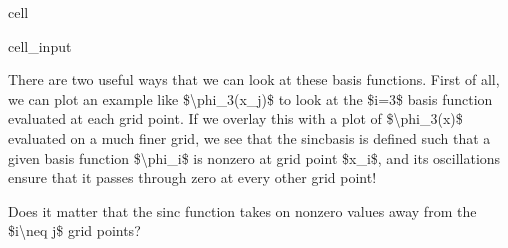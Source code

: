 \documentclass[letterpaper,10pt,english]{jupyterBook}
\begin{document}
\begin{sphinxuseclass}{cell}\begin{sphinxVerbatimInput}

\begin{sphinxuseclass}{cell_input}
\begin{sphinxVerbatim}[commandchars=\\\{\}]
  
  
  

  
  
  

 
       
\end{sphinxVerbatim}

\end{sphinxuseclass}\end{sphinxVerbatimInput}

\end{sphinxuseclass}
\sphinxAtStartPar
There are two useful ways that we can look at these basis functions. First of all, we can plot an example like \$\textbackslash{}phi\_3(x\_j)\$ to look at the \$i=3\$ basis function evaluated at each grid point. If we overlay this with a plot of \$\textbackslash{}phi\_3(x)\$ evaluated on a much finer grid, we see that the sinc\sphinxhyphen{}basis is defined such that a given basis function \$\textbackslash{}phi\_i\$ is nonzero at grid point \$x\_i\$, and its oscillations ensure that it passes through zero at every other grid point!

\sphinxAtStartPar
{} Does it matter that the sinc function takes on nonzero values away from the \$i\textbackslash{}neq j\$ grid points?
\end{document}
